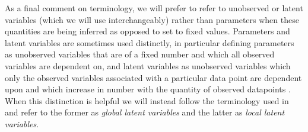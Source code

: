 
As a final comment on terminology, we will prefer to refer to unobserved or latent variables (which we will use interchangeably) rather than parameters when these quantities are being inferred as opposed to set to fixed values. %
Parameters and latent variables are sometimes used distinctly, in particular defining parameters as unobserved variables that are of a fixed number and which all observed variables are dependent on, and latent variables as unobserved variables which only the observed variables associated with a particular data point are dependent upon and which increase in number with the quantity of observed datapoints \citep{bishop2006pattern}. When this distinction is helpful we will instead follow the terminology used in \citep{blei2017variational} and refer to the former as \emph{global latent variables} and the latter as \emph{local latent variables}.


